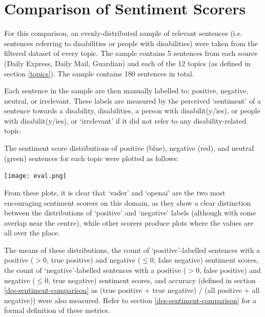 \documentclass{report}
\begin{document}
\section{Comparison of Sentiment Scorers} \label{Comparison of sentiment scorers}
For this comparison, an evenly-distributed sample of relevant sentences (i.e. sentences referring to disabilities or people with disabilities) were taken from the filtered dataset of every topic. 
The sample contains 5 sentences from each source (Daily Express, Daily Mail, Guardian) and each of the 12 topics (as defined in section \ref{topics}). %
The sample contains 180 sentences in total. %

Each sentence in the sample are then manually labelled to: positive, negative, neutral, or irrelevant.
These labels are measured by the perceived `sentiment' of a sentence towards a disability, disabilities, a person with disabilit(y/ies), or people with disabilit(y/ies), or `irrelevant' if it did not refer to any disability-related topic.

The sentiment score distributions of positive (blue), negative (red), and neutral (green) sentences for each topic were plotted as follows:

\noindent
\texttt{[image: eval.png]}

From these plots, it is clear that `vader' \cite{VADER} and `openai' \cite{OpenAI} are the two most encouraging sentiment scorers on this domain, as they show a clear distinction between the distributions of `positive' and `negative' labels (although with some overlap near the centre), while other scorers produce plots where the values are all over the place.

The means of these distributions, the count of `positive'-labelled sentences with a positive ($>$0, true positive) and negative ($\le$0, false negative) sentiment scores, the count of `negative'-labelled sentences with a positive ($>$0, false positive) and negative ($\le$0, true negative) sentiment scores, and accuracy (defined in section \ref{des-sentiment-comparison} as (true positive + true negative) / (all positive + all negative)) were also measured.
Refer to section \ref{des-sentiment-comparison} for a formal definition of these metrics.
\end{document}

